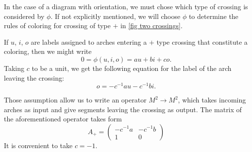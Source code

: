 In the case of a diagram with orientation, we must chose which type of crossing is considered by $\phi$. If not explicitly mentioned, we will choose $\phi$ to determine the rules of coloring for crossing of type $+$ in \cref{fig two crossings}. 

If $u$, $i$, $o$ are labels assigned to arches entering a $+$ type crossing that constitute a coloring, then we might write 
$$0=\phi(u, i, o)=au+bi+co.$$
Taking $c$ to be a unit, we get the following equation for the label of the arch leaving the crossing:
$$o=-c^{-1}au-c^{-1}bi.$$

Those assumption allow us to write an operator $M^2\to M^2$, which takes incoming arches as input and give segments leaving the crossing as output. The matrix of the aforementioned operator takes form
$$
A_+=\begin{pmatrix}
  -c^{-1}a & -c^{-1}b \\ 
  1 & 0
\end{pmatrix}
$$
It is convenient to take $c=-1$.

